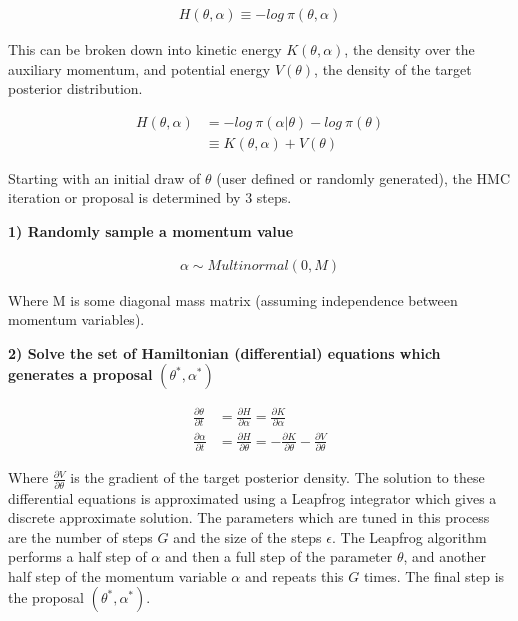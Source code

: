 \documentclass[12pt, a4paper]{article}
\begin{document}
$$
\begin{aligned}
H(\theta, \alpha) \equiv - log \: \pi(\theta, \alpha)
\end{aligned}
$$

This can be broken down into kinetic energy $K(\theta, \alpha)$, the density over the auxiliary momentum, and potential energy $V(\theta)$, the density of the target posterior distribution.

$$
\begin{aligned}
H(\theta, \alpha) &= - log \: \pi(\alpha | \theta) - log \: \pi(\theta) \\ 
&\equiv  K(\theta, \alpha) + V(\theta)
\end{aligned}
$$

 Starting with an initial draw of $\theta$ (user defined or randomly generated), the HMC iteration or proposal is determined by 3 steps.

\textbf{1) Randomly sample a momentum value}

$$
\begin{aligned}
\alpha\sim Multinormal(0, M)
\end{aligned}
$$

Where M is some diagonal mass matrix (assuming independence between momentum variables).

\textbf{2) Solve the set of Hamiltonian (differential) equations which generates a proposal} $(\theta^{\ast}, \alpha^{\ast})$

$$
\begin{aligned}
\frac{\partial \theta}{\partial t} &= \frac{\partial H}{\partial \alpha} = \frac{\partial K}{\partial \alpha} \\
\frac{\partial \alpha}{\partial t} &= \frac{\partial H}{\partial \theta} = - \frac{\partial K}{\partial \theta} - \frac{\partial V}        {\partial \theta}
\end{aligned}
$$

Where $\frac{\partial V}{\partial \theta}$ is the gradient of the target posterior density. The solution to these differential equations is approximated using a Leapfrog integrator which gives a discrete approximate solution. The parameters which are tuned in this process are the number of steps $G$ and the size of the steps $\epsilon$. The Leapfrog algorithm performs a half step of $\alpha$ and then a full step of the parameter $\theta$, and another half step of the momentum variable $\alpha$ and repeats this $G$ times. The final step is the proposal $(\theta^{\ast}, \alpha^{\ast})$.
\end{document}
